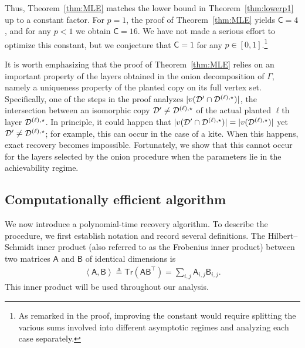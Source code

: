 \documentclass[12pt]{article}
\newcommand{\calD}{{\cal D}}
\newcommand{\innerP}[1]{\left\langle#1\right\rangle}
\newcommand{\s}[1]{\mathsf{#1}}
\begin{document}
Thus, Theorem~\ref{thm:MLE} matches the lower bound in Theorem~\ref{thm:lowerp1} up to a constant factor. For $p=1$, the proof of Theorem~\ref{thm:MLE} yields $\s{C}=4$, and for any $p<1$ we obtain $\s{C}=16$. We have not made a serious effort to optimize this constant, but we conjecture that $\s{C}=1$ for any $p\in[0,1]$.\footnote{As remarked in the proof, improving the constant would require splitting the various sums involved into different asymptotic regimes and analyzing each case separately.}

It is worth emphasizing that the proof of Theorem~\ref{thm:MLE} relies on an important property of the layers obtained in the onion decomposition of $\Gamma$, namely a uniqueness property of the planted copy on its full vertex set. Specifically, one of the steps in the proof analyzes $|v(\calD' \cap \calD^{(\ell),\star})|$, the intersection between an isomorphic copy $\calD'\neq\calD^{(\ell),\star}$ of the actual planted $\ell$th layer $\calD^{(\ell),\star}$. In principle, it could happen that $|v(\calD' \cap \calD^{(\ell),\star})| = |v(\calD^{(\ell),\star})|$ yet $\calD' \neq \calD^{(\ell),\star}$; for example, this can occur in the case of a kite. When this happens, exact recovery becomes impossible. Fortunately, we show that this cannot occur for the layers selected by the onion procedure when the parameters lie in the achievability regime.

\subsection{Computationally efficient algorithm}\label{sec:compConvex}

We now introduce a polynomial-time recovery algorithm. To describe the procedure, we first establish notation and record several definitions. The Hilbert--Schmidt inner product (also referred to as the Frobenius inner product) between two matrices $\s{A}$ and $\s{B}$ of identical dimensions is
\begin{align}
    \innerP{\s{A},\s{B}} \triangleq \s{Tr}(\s{A}\s{B}^\top)=\sum_{i,j}\s{A}_{i,j}\s{B}_{i,j}.
\end{align}
This inner product will be used throughout our analysis.
\end{document}
